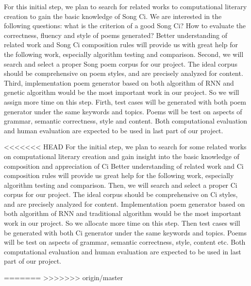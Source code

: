 For this initial step, we plan to search for related works to computational literary creation to gain the basic knowledge of Song Ci.
%
We are interested in the following questions: what is the criterion of a good Song Ci? How to evaluate the correctness, fluency and style of poems generated?
%
Better understanding of related work and Song Ci composition rules will provide us with great help for the following work, especially algorithm testing and comparison. 
%
Second, we will search and select a proper Song poem corpus for our project. The ideal corpus should be comprehensive on poem styles, and are precisely analyzed for content. 
%
Third, implementation poem generator based on both algorithm of RNN and genetic algorithm would be the most important work in our project. So we will assign more time on this step. 
%
Firth, test cases will be generated with both poem generator under the same keywords and topics. Poems will be test on aspects of grammar, semantic correctness, style and content. Both computational evaluation and human evaluation are expected to be used in last part of our project.


<<<<<<< HEAD
For the initial step, we plan to search for some related works on computational literary creation and gain insight into the basic knowledge of composition and appreciation of Ci Better understanding of related work and Ci composition rules will provide us great help for the following work, especially algorithm testing and comparison. Then, we will search and select a proper Ci corpus for our project. The ideal corpus should be comprehensive on Ci styles, and are precisely analyzed for content. Implementation poem generator based on both algorithm of RNN and traditional algorithm would be the most important work in our project. So we allocate more time on this step. Then test cases will be generated with both Ci generator under the same keywords and topics. Poems will be test on aspects of grammar, semantic correctness, style, content etc. Both computational evaluation and human evaluation are expected to be used in last part of our project.

=======
>>>>>>> origin/master
